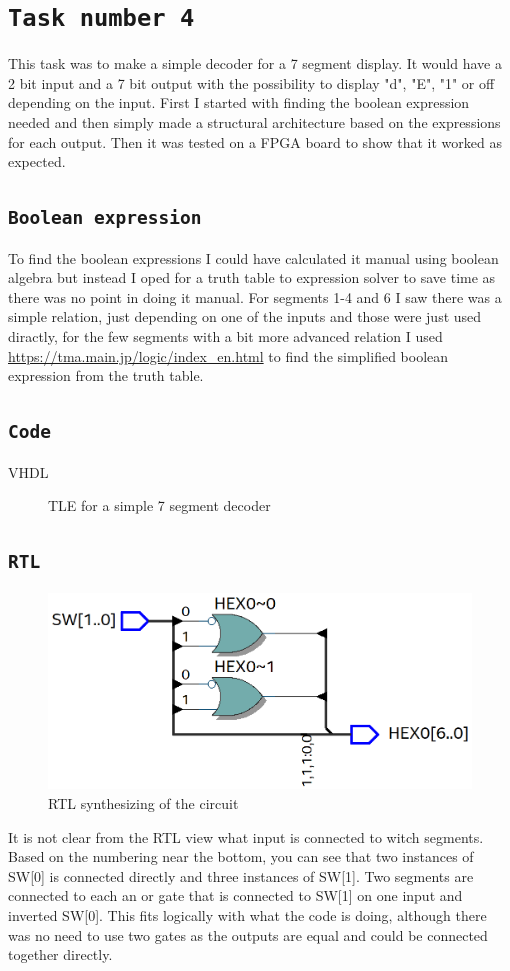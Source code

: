 \documentclass{article}
\let\oldsection\section
\renewcommand{\section}[1]{%
  \oldsection{\texttt{#1}} %
  \setcounter{subsection}{-1} %
  \setcounter{figure}{-1} %
}
\let\oldsubsection\subsection
\renewcommand{\subsection}[1]{%
  \oldsubsection{\texttt{#1}}%
  \setcounter{subsubsection}{-1}%
}
\newcommand{\writecode}[3][Example Code]{%
    \begin{codeBlock}{#1}%
    \end{codeBlock}%
    \begin{figure}[h] %
        \centering
        \renewcommand\figurename{Code}
        \caption{#3} %
        \label{Code:#2} %
    \end{figure}
}
\begin{document}
\section{Task number 4}
This task was to make a simple decoder for a 7 segment display. It would have a 2 bit input and a 7 bit output with the possibility to display "d", "E", "1" or off depending on the input. First I started with finding the boolean expression needed and then simply made a structural architecture based on the expressions for each output. Then it was tested on a FPGA board to show that it worked as expected.

\subsection{Boolean expression}
To find the boolean expressions I could have calculated it manual using boolean algebra but instead I oped for a truth table to expression solver to save time as there was no point in doing it manual. For segments 1-4 and 6 I saw there was a simple relation, just depending on one of the inputs and those were just used diractly, for the few segments with a bit more advanced relation I used \url{https://tma.main.jp/logic/index_en.html} to find the simplified boolean expression from the truth table.

\subsection{Code}
\writecode[VHDL]{Part4_Code.vhd}{TLE for a simple 7 segment decoder}
\clearpage

\subsection{RTL}
\begin{figure}[h]
    \centering
    \includegraphics[width=1\textwidth]{Figures/Part4_RTL.png}
    \caption{RTL synthesizing of the circuit}
    \label{fig:T04rtl}
\end{figure}
It is not clear from the RTL view what input is connected to witch segments. Based on the numbering near the bottom, you can see that two instances of SW[0] is connected directly and three instances of SW[1]. Two segments are connected to each an or gate that is connected to SW[1] on one input and inverted SW[0]. This fits logically with what the code is doing, although there was no need to use two gates as the outputs are equal and could be connected together directly. 
\clearpage
\end{document}
